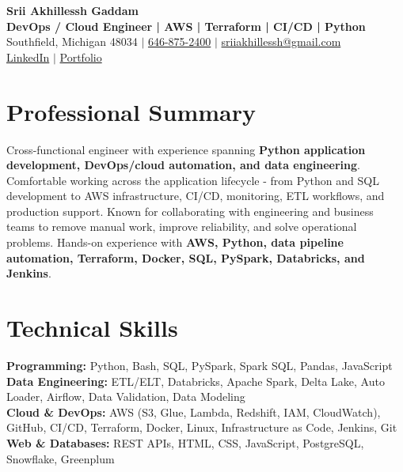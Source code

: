 \documentclass[letterpaper,10pt]{article}
\begin{document}
\fontsize{9.35pt}{10.45pt}\selectfont

\begin{center}
    {\LARGE \textbf{Srii Akhillessh Gaddam}} \\[-1pt]
    \textbf{DevOps / Cloud Engineer | AWS | Terraform | CI/CD | Python} \\[2pt]
    Southfield, Michigan 48034 $|$
    \href{tel:6468752400}{646-875-2400} $|$
    \href{mailto:sriiakhillessh@gmail.com}{sriiakhillessh@gmail.com} \\[1pt]
    \href{https://www.linkedin.com/in/srii-akhiilessh-gaddam-b48668191/}{LinkedIn} $|$
    \href{https://sriiakhillesshg.github.io/portfolio/}{Portfolio}
\end{center}
\vspace{-8pt}

\section{Professional Summary}
\small{Cross-functional engineer with experience spanning \textbf{Python application development, DevOps/cloud automation, and data engineering}. Comfortable working across the application lifecycle - from Python and SQL development to AWS infrastructure, CI/CD, monitoring, ETL workflows, and production support. Known for collaborating with engineering and business teams to remove manual work, improve reliability, and solve operational problems. Hands-on experience with \textbf{AWS, Python, data pipeline automation, Terraform, Docker, SQL, PySpark, Databricks, and Jenkins}.}

\section{Technical Skills}
\small{
\textbf{Programming:} Python, Bash, SQL, PySpark, Spark SQL, Pandas, JavaScript \\
\textbf{Data Engineering:} ETL/ELT, Databricks, Apache Spark, Delta Lake, Auto Loader, Airflow, Data Validation, Data Modeling \\
\textbf{Cloud \& DevOps:} AWS (S3, Glue, Lambda, Redshift, IAM, CloudWatch), GitHub, CI/CD, Terraform, Docker, Linux, Infrastructure as Code, Jenkins, Git \\
\textbf{Web \& Databases:} REST APIs, HTML, CSS, JavaScript, PostgreSQL, Snowflake, Greenplum
}
\end{document}
